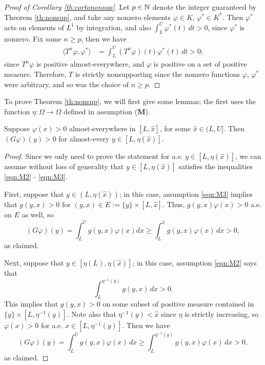 \begin{proof}[Proof of Corollary \ref{th:cortononsup}]
	Let $p \in \mathbb{N}$ denote the integer guaranteed by Theorem \ref{th:nonsup}, and take any nonzero elements $\varphi \in K$, $\varphi^* \in K^*$. Then $\varphi^*$ acts on elements of $L^1$ by integration, and also $\int_L^U \varphi^*(t) \, dt > 0$, since $\varphi^*$ is nonzero. Fix some $n \geq p$, then we have
	\begin{align*}
		\langle T^n \varphi, \varphi^* \rangle &= \int_L^U (T^n \varphi)(t)\varphi^*(t) \, dt > 0;
	\end{align*}
	since $T^n\varphi$ is positive almost-everywhere, and $\varphi$ is positive on a set of positive measure. Therefore, $T$ is strictly nonsupporting since the nonzero functions $\varphi$, $\varphi^*$ were arbitrary, and so was the choice of $n \geq p$. 
\end{proof}

To prove Theorem \ref{th:nonsup}, we will first give some lemmas; the first uses the function $\eta:\Omega \to \Omega$ defined in assumption (\textbf{M}).

\begin{lemma}
	Suppose $\varphi(x)>0$ almost-everywhere in $[L, \hat x]$, for some $\hat x \in (L, U]$. Then $(G\varphi)(y) > 0$ for almost-every $y \in [L, \eta(\hat x)]$.
\end{lemma}

\begin{proof}
	Since we only need to prove the statement for a.e. $y \in [L, \eta(\hat x)]$, we can assume without loss of generality that $y \in [L, \eta(\hat x)]$ satisfies the inequalities \eqref{eqn:M2} - \eqref{eqn:M3}.
	
	First, suppose that $y \in (L, \eta(\hat x))$; in this case, assumption \eqref{eqn:M3} implies that $g(y, x) >0$ for $(y, x) \in E:=\{y\} \times [L, \hat x]$. Thus, $g(y, x) \varphi(x)>0$ a.e. on $E$ as well, so
	\[(G\varphi)(y) = \int_L^U g(y, x) \varphi(x) dx \geq \int_L^{\hat x} g(y, x) \varphi(x) \, dx >0, \]
	as claimed.
	
	Next, suppose that $y \in [\eta(L), \eta(\hat x)]$; in this case, assumption \eqref{eqn:M2} says that
	\[\int_L^{\eta^{-1}(y)} g(y, x) \, dx >0.\]
	This implies that $g(y, x) >0$ on some subset of positive measure contained in $\{y\} \times [L, \eta^{-1}(y)]$. Note also that $\eta^{-1}(y) < \hat x$ since $\eta$ is strictly increasing, so $\varphi(x) >0$ for a.e. $x \in [L, \eta^{-1}(y)]$. Then we have
	\[(G\varphi)(y) = \int_L^U g(y, x) \varphi(x) \, dx \geq \int_L^{\eta^{-1}(y)} g(y, x) \varphi(x) \, dx > 0,\]
	as claimed.
	
\end{proof}

